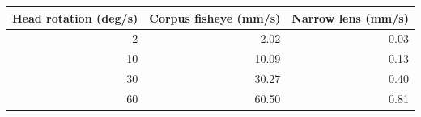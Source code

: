 \begin{tabular}{@{}rrr@{}}
\toprule
Head rotation (deg/s) & Corpus fisheye (mm/s) & Narrow lens (mm/s) \\
\midrule
2 & 2.02 & 0.03 \\
10 & 10.09 & 0.13 \\
30 & 30.27 & 0.40 \\
60 & 60.50 & 0.81 \\
\bottomrule
\end{tabular}
